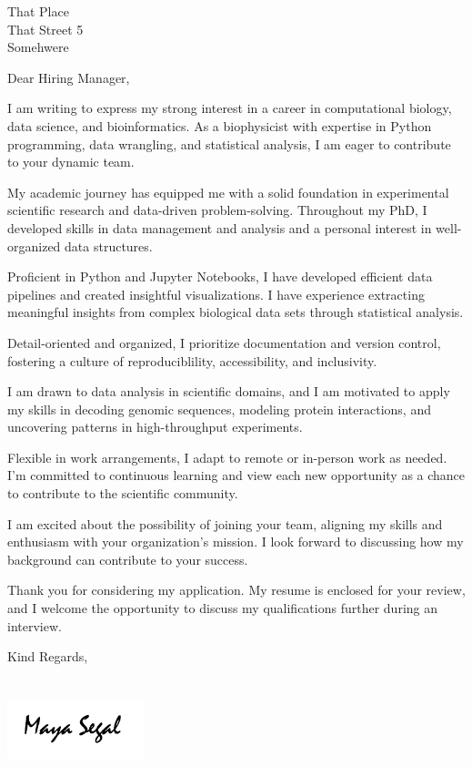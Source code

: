 \documentclass[nunito,noadress,custcol]{friggeri-txt}                       %
\begin{document}

\begin{letter}{                                                  %
That Place \\                                                    %
That Street 5 \\
Somehwere}

\opening{Dear Hiring Manager,}

I am writing to express my strong interest in a career in computational biology, data science, and bioinformatics. 
As a biophysicist with expertise in Python programming, data wrangling, and statistical analysis, I am eager to contribute to your dynamic team.

My academic journey has equipped me with a solid foundation in experimental scientific research and data-driven problem-solving. 
Throughout my PhD, I developed skills in data management and analysis and a personal interest in well-organized data structures.

Proficient in Python and Jupyter Notebooks, I have developed efficient data pipelines and created insightful visualizations. 
I have experience extracting meaningful insights from complex biological data sets through statistical analysis.

Detail-oriented and organized, I prioritize documentation and version control, fostering a culture of reproduciblility, accessibility, and inclusivity.

I am drawn to data analysis in scientific domains, and I am motivated to apply my skills in decoding genomic sequences, modeling protein interactions, and uncovering patterns in high-throughput experiments.

Flexible in work arrangements, I adapt to remote or in-person work as needed. 
I'm committed to continuous learning and view each new opportunity as a chance to contribute to the scientific community.

I am excited about the possibility of joining your team, aligning my skills and enthusiasm with your organization's mission. 
I look forward to discussing how my background can contribute to your success.

Thank you for considering my application. 
My resume is enclosed for your review, and I welcome the opportunity to discuss my qualifications further during an interview.

Kind Regards,\\
\\
\\
\includegraphics[width=40mm]{signature.png}                                                %
\vspace*{-40pt}
\end{letter}
\end{document}
